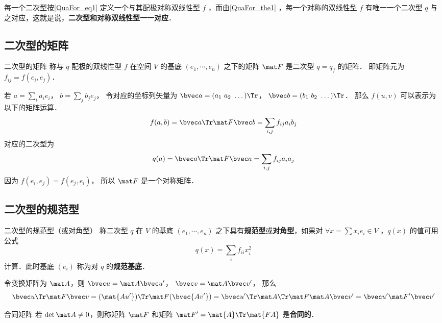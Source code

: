 每一个二次型按\autoref{QuaFor_eq1} 定义一个与其配极对称双线性型 $f$ ，而由\autoref{QuaFor_the1} ，每一个对称的双线性型 $f$ 有唯一一个二次型 $q$ 与之对应，这就是说，\textbf{二次型和对称双线性型一一对应}．

\subsection{二次型的矩阵}
\begin{definition}{二次型的矩阵}
称与 $q$ 配极的双线性型 $f$ 在空间 $V$ 的基底 $(e_1,\cdots,e_n)$ 之下的矩阵 $\mat F$ 是二次型 $q=q_f$ 的矩阵． 即矩阵元为 $f_{ij} = f(e_i, e_j)$．
\end{definition}

若 $a = \sum_i a_i e_i$， $b = \sum_j b_j e_j$， 令对应的坐标列矢量为 $\bvec a = (a_1\ a_2\ \dots)\Tr$， $\bvec b = (b_1\ b_2\ \dots)\Tr$． 那么 $f(u, v)$ 可以表示为以下的矩阵运算．
\begin{equation}
f(a, b) = \bvec a\Tr \mat F \bvec b = \sum_{i,j} f_{ij}a_i b_j
\end{equation}
对应的二次型为
\begin{equation}
q(a) = \bvec a\Tr \mat F \bvec a = \sum_{i,j} f_{ij}a_i a_j
\end{equation}
因为 $f(e_i, e_j) = f(e_j, e_i)$， 所以 $\mat F$ 是一个对称矩阵．

\subsection{二次型的规范型}
\begin{definition}{二次型的规范型（或对角型）}\label{QuaFor_def1}
称二次型 $q$ 在 $V$ 的基底 $(e_1,\cdots,e_n)$ 之下具有\textbf{规范型}或\textbf{对角型}，如果对 $\forall x=\sum x_i e_i\in V$ ，$q(x)$ 的值可用公式
\begin{equation}
q(x)=\sum_{i}f_{ii}x_i^2
\end{equation}
计算．此时基底 $(e_i)$ 称为对 $q$ 的\textbf{规范基底}．
\end{definition}

令变换矩阵为 $\mat A$，则 $\bvec u = \mat A \bvec u'$， $\bvec v = \mat A \bvec v'$， 那么
\begin{equation}
\bvec u\Tr \mat F \bvec v = (\mat {Au'})\Tr \mat F (\bvec {Av'}) = \bvec u'\Tr \mat A\Tr\mat F \mat A \bvec v'=\bvec u'\mat F' \bvec v'
\end{equation}
\begin{definition}{合同矩阵}
若 $\det \mat A\neq 0$，则称矩阵 $\mat F$ 和矩阵 $\mat F'=\mat{A}\Tr \mat{FA}$ 是\textbf{合同的}．
\end{definition}
